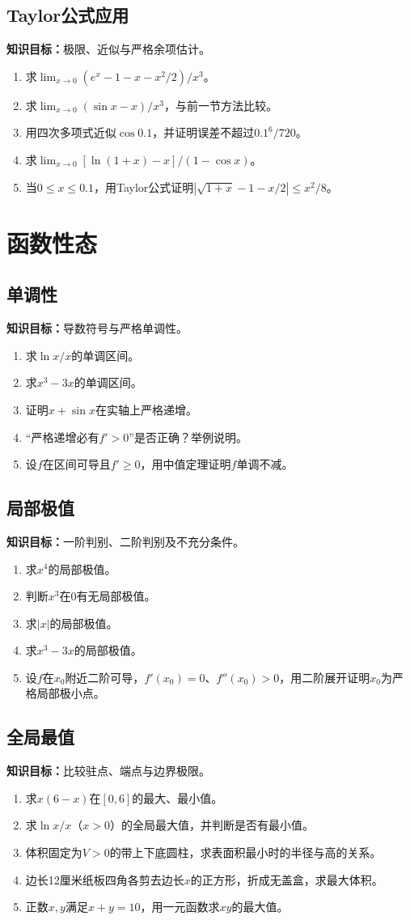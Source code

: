\documentclass[11pt,a4paper,fontset=fandol]{ctexrep}
\newcommand{\goal}[1]{\textbf{知识目标：}#1\par}
\begin{document}
\subsection{Taylor公式应用}
\goal{极限、近似与严格余项估计。}
\begin{enumerate}
\item 求$\lim_{x\to0}(e^x-1-x-x^2/2)/x^3$。
\item 求$\lim_{x\to0}(\sin x-x)/x^3$，与前一节方法比较。
\item 用四次多项式近似$\cos0.1$，并证明误差不超过$0.1^6/720$。
\item 求$\lim_{x\to0}[\ln(1+x)-x]/(1-\cos x)$。
\item 当$0\le x\le0.1$，用Taylor公式证明$|\sqrt{1+x}-1-x/2|\le x^2/8$。
\end{enumerate}
\section{函数性态}
\subsection{单调性}
\goal{导数符号与严格单调性。}
\begin{enumerate}
\item 求$\ln x/x$的单调区间。
\item 求$x^3-3x$的单调区间。
\item 证明$x+\sin x$在实轴上严格递增。
\item “严格递增必有$f'>0$”是否正确？举例说明。
\item 设$f$在区间可导且$f'\ge0$，用中值定理证明$f$单调不减。
\end{enumerate}
\subsection{局部极值}
\goal{一阶判别、二阶判别及不充分条件。}
\begin{enumerate}
\item 求$x^4$的局部极值。
\item 判断$x^3$在0有无局部极值。
\item 求$|x|$的局部极值。
\item 求$x^3-3x$的局部极值。
\item 设$f$在$x_0$附近二阶可导，$f'(x_0)=0$、$f''(x_0)>0$，用二阶展开证明$x_0$为严格局部极小点。
\end{enumerate}
\subsection{全局最值}
\goal{比较驻点、端点与边界极限。}
\begin{enumerate}
\item 求$x(6-x)$在$[0,6]$的最大、最小值。
\item 求$\ln x/x$（$x>0$）的全局最大值，并判断是否有最小值。
\item 体积固定为$V>0$的带上下底圆柱，求表面积最小时的半径与高的关系。
\item 边长12厘米纸板四角各剪去边长$x$的正方形，折成无盖盒，求最大体积。
\item 正数$x,y$满足$x+y=10$，用一元函数求$xy$的最大值。
\end{enumerate}
\end{document}
